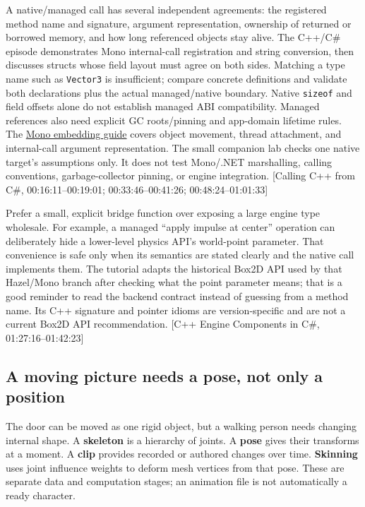 A native/managed call has several independent agreements: the registered method name and signature, argument representation, ownership of returned or borrowed memory, and how long referenced objects stay alive. The C++/C\# episode demonstrates Mono internal-call registration and string conversion, then discusses structs whose field layout must agree on both sides. Matching a type name such as \texttt{Vector3} is insufficient; compare concrete definitions and validate both declarations plus the actual managed/native boundary. Native \texttt{sizeof} and field offsets alone do not establish managed ABI compatibility. Managed references also need explicit GC roots/pinning and app-domain lifetime rules. The \href{https://www.mono-project.com/docs/advanced/embedding/}{Mono embedding guide} covers object movement, thread attachment, and internal-call argument representation. The small companion lab checks one native target's assumptions only. It does not test Mono/.NET marshalling, calling conventions, garbage-collector pinning, or engine integration. {[}Calling C++ from C\#, 00:16:11--00:19:01; 00:33:46--00:41:26; 00:48:24--01:01:33{]}

Prefer a small, explicit bridge function over exposing a large engine type wholesale. For example, a managed ``apply impulse at center'' operation can deliberately hide a lower-level physics API's world-point parameter. That convenience is safe only when its semantics are stated clearly and the native call implements them. The tutorial adapts the historical Box2D API used by that Hazel/Mono branch after checking what the point parameter means; that is a good reminder to read the backend contract instead of guessing from a method name. Its C++ signature and pointer idioms are version-specific and are not a current Box2D API recommendation. {[}C++ Engine Components in C\#, 01:27:16--01:42:23{]}

\subsection{A moving picture needs a pose, not only a position}\label{06-engine-ii-ch040-a-moving-picture-needs-a-pose-not-only-a-position}

The door can be moved as one rigid object, but a walking person needs changing internal shape. A \textbf{skeleton} is a hierarchy of joints. A \textbf{pose} gives their transforms at a moment. A \textbf{clip} provides recorded or authored changes over time. \textbf{Skinning} uses joint influence weights to deform mesh vertices from that pose. These are separate data and computation stages; an animation file is not automatically a ready character.

